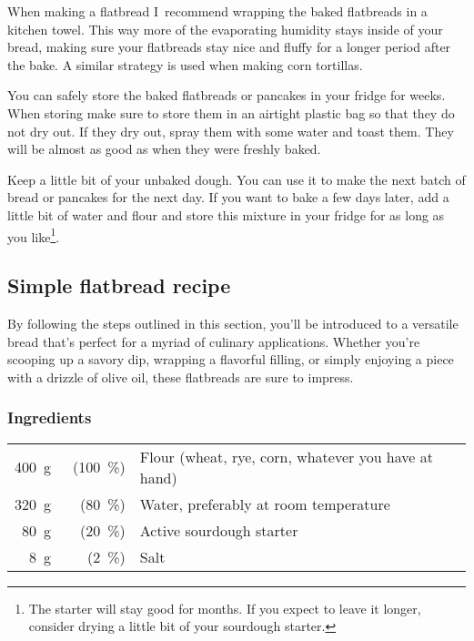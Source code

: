 When making a flatbread I~recommend wrapping the baked flatbreads in a kitchen
towel. This way more of the evaporating humidity stays inside of your bread,
making sure your flatbreads stay nice and fluffy for a longer period after the
bake. A similar strategy is used when making corn tortillas.

You can safely store the baked flatbreads or pancakes in your fridge
for weeks. When storing make sure to store them in an airtight plastic bag so that
they do not dry out. If they dry out, spray them with some water and toast them.
They will be almost as good as when they were freshly baked.

Keep a little bit of your unbaked dough. You can use it to make the next
batch of bread or pancakes for the next day. If you want to bake a few days later, add
a little bit of water and flour and store this mixture in your fridge
for as long as you like\footnote{The starter will stay good for months. If you expect to
leave it longer, consider drying a little bit of your sourdough starter.}.

\subsection{Simple flatbread recipe}%
\label{subsec:flat-bread-recipe}

By following the steps outlined in this section,
you'll be introduced to a versatile bread that's perfect for a myriad of
culinary applications. Whether you're scooping up a savory dip,
wrapping a flavorful filling, or simply enjoying a piece with a drizzle
of olive oil, these flatbreads are sure to impress.

\subsubsection*{Ingredients}

\begin{tabular}{r@{}rl@{}}
\qty{400}{\gram} &~(\qty{100}{\percent}) & Flour (wheat, rye, corn, whatever you have at hand)\\
\qty{320}{\gram} &  (\qty{80}{\percent}) & Water, preferably at room temperature\\
\qty{80}{\gram}  &  (\qty{20}{\percent}) & Active sourdough starter\\
\qty{8}{\gram}   &   (\qty{2}{\percent}) & Salt\\
\end{tabular}

